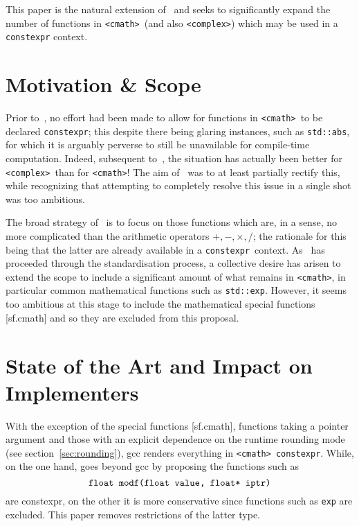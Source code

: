 \documentclass[prd,twocolumn,amsmath,amssymb,nofootinbib,eqsecnum]{revtex4-1}
\newcommand{\constexpr}{\code{constexpr}\xspace}
\newcommand{\code}[1]{{\tt #1}}
\newcommand{\header}[1]{{\tt <#1>}}
\newcommand{\cmath}{\header{cmath}}
\newcommand{\complex}{\header{complex}}
\newcommand{\Operators}{\ensuremath{+,-,\times,/}}
\begin{document}
This paper is the natural extension of~\cite{Rosten-constexpr} and seeks to significantly expand the number of functions in \cmath\ (and also \complex) which may be used in a \constexpr context. 


\section{Motivation \& Scope}

Prior to~\cite{Rosten-constexpr}, no effort had been made to allow for functions in \cmath\ to be declared \constexpr; this despite there being glaring instances, such as \code{std::abs}, for which it is arguably perverse to still be unavailable for compile-time computation. Indeed, subsequent to~\cite{AP-complex}, the situation has actually been better for \complex\ than for \cmath! The aim of~\cite{Rosten-constexpr} was to at least partially rectify this, while recognizing that attempting to completely resolve this issue in a single shot was too ambitious.

The broad strategy of~\cite{Rosten-constexpr} is to focus on those functions which are, in a sense, no more complicated than the arithmetic operators \Operators; the rationale for this being that the latter are already available in a \constexpr\ context.
As~\cite{Rosten-constexpr} has proceeded through the standardisation process, a collective desire has arisen to extend the scope to include a significant amount of what remains in \cmath, in particular common mathematical functions such as \code{std::exp}. However, it seems too ambitious at this stage to include the mathematical special functions [sf.cmath] and so they are excluded from this proposal.


\section{State of the Art and Impact on Implementers}

With the exception of the special functions [sf.cmath], functions taking a pointer argument and those with an explicit dependence on the runtime rounding mode (see section~\ref{sec:rounding}), gcc renders everything in \cmath\ \constexpr. While, on the one hand, \cite{Rosten-constexpr} goes beyond gcc by proposing the functions such as
\[
	\mbox{\code{float modf(float value, float* iptr)}}
\]
are constexpr, on the other it is more conservative since functions such as \code{exp} are excluded. This paper removes restrictions of the latter type.
\end{document}

